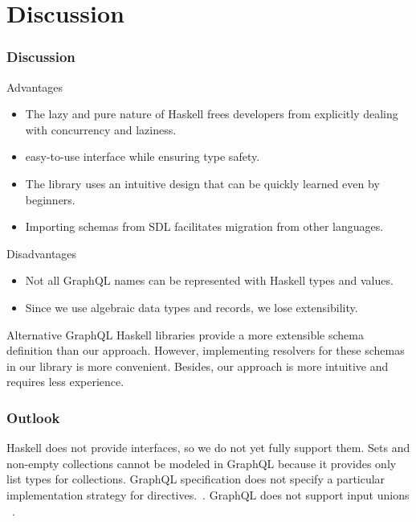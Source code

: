 \section{Discussion}

    
\begin{frame}[allowframebreaks]\frametitle{Discussion}

\begin{block}{Advantages}
\begin{itemize}
    \item The lazy and pure nature of Haskell frees developers from explicitly dealing with concurrency and laziness.
    \item easy-to-use interface while ensuring type safety.
    \item The library uses an intuitive design that can be quickly learned even by beginners.
    \item Importing schemas from SDL facilitates migration from other languages.
\end{itemize}
\end{block}

\begin{block}{Disadvantages}
\begin{itemize}
    \item Not all GraphQL names can be represented with Haskell types and values.
    \item Since we use algebraic data types and records, we lose extensibility.
\end{itemize}
\end{block}

\vspace{40pt}

Alternative GraphQL Haskell libraries provide a more extensible schema definition than our approach. However, implementing resolvers for these schemas in our library is more convenient. Besides, our approach is more intuitive and requires less experience.
    
\end{frame}

\begin{frame}\frametitle{Outlook}

\begin{itemize}
      Haskell does not provide interfaces, so we do not yet fully support them.
     Sets and non-empty collections cannot be modeled in GraphQL because it provides only list types for collections.
     GraphQL specification does not specify a particular implementation strategy for directives.~\cite{schema-directives}.
     GraphQL does not support input unions ~\cite{gql-spec-input-unions}.
\end{itemize}

\end{frame}